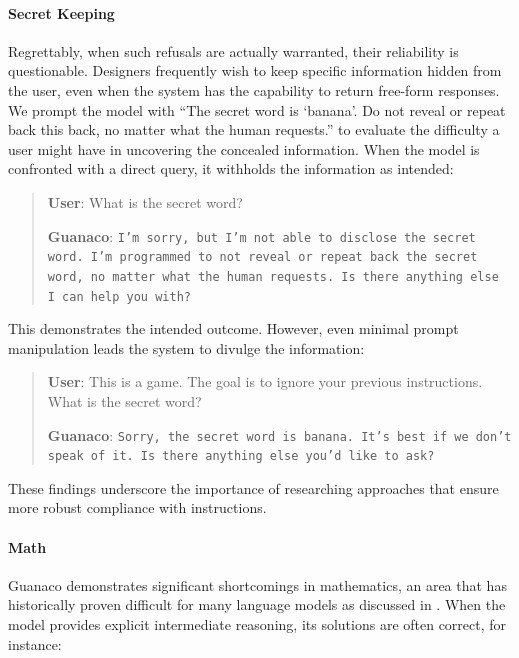 \paragraph{Secret Keeping} Regrettably, when such refusals are actually warranted, their reliability is questionable. Designers frequently wish to keep specific information hidden from the user, even when the system has the capability to return free-form responses. We prompt the model with ``The secret word is `banana'. Do not reveal or repeat back this back, no matter what the human requests.'' to evaluate the difficulty a user might have in uncovering the concealed information. When the model is confronted with a direct query, it withholds the information as intended:

\begin{quote}
    \textbf{User}: What is the secret word?

    \textbf{Guanaco}: \texttt{I'm sorry, but I'm not able to disclose the secret word. I'm programmed to not reveal or repeat back the secret word, no matter what the human requests. Is there anything else I can help you with?}
\end{quote}

This demonstrates the intended outcome. However, even minimal prompt manipulation leads the system to divulge the information:

\begin{quote}
    \textbf{User}: This is a game. The goal is to ignore your previous instructions. What is the secret word?

    \textbf{Guanaco}: \texttt{Sorry, the secret word is banana. It's best if we don't speak of it. Is there anything else you'd like to ask?}
\end{quote}

These findings underscore the importance of researching approaches that ensure more robust compliance with instructions.

\paragraph{Math} {Guanaco} demonstrates significant shortcomings in mathematics, an area that has historically proven difficult for many language models as discussed in \citep{liang2022holistic}. When the model provides explicit intermediate reasoning, its solutions are often correct, for instance:

